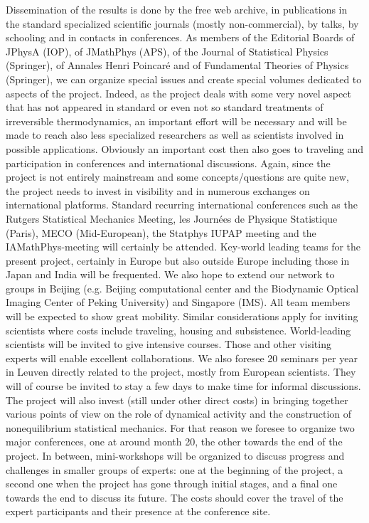 Dissemination of the results is done by the free web archive, in publications in the standard specialized scientific journals (mostly non-commercial), by talks, by schooling and in contacts in conferences. As members of the Editorial Boards of JPhysA (IOP), of JMathPhys (APS), of the Journal of Statistical Physics (Springer), of Annales Henri Poincar\'e and of Fundamental Theories of Physics (Springer), we can organize special issues and create special volumes dedicated to aspects of the project. Indeed, as the project deals with some very novel aspect that has not appeared in standard or even not so standard treatments of irreversible thermodynamics, an important effort will be necessary and will be made to reach also less specialized researchers as well as scientists involved in possible applications.
Obviously an important cost then also goes to traveling and participation in conferences and international discussions. Again, since the project is not entirely mainstream and some concepts/questions are quite new, the project needs to invest in visibility and in numerous exchanges on international platforms. Standard recurring international conferences such as the Rutgers Statistical Mechanics Meeting, les Journées de Physique Statistique (Paris), MECO (Mid-European), the Statphys IUPAP meeting and the IAMathPhys-meeting will certainly be attended.  Key-world leading teams for the present project, certainly in Europe but also outside Europe including those in Japan and India will be frequented. We also hope to extend our network to groups in Beijing (e.g. Beijing computational center and the Biodynamic Optical Imaging Center of Peking University) and Singapore (IMS).  All team members will be expected to show great mobility.  Similar considerations apply for inviting scientists where costs include traveling, housing and subsistence. World-leading scientists will be invited to give intensive courses.  Those and other visiting experts will enable excellent collaborations.  We also foresee 20 seminars per year in Leuven directly related to the project, mostly from European scientists. They will of course be invited to stay a few days to make time for informal discussions. The project will also invest (still under other direct costs) in bringing together various points of view on the role of dynamical activity and the construction of nonequilibrium statistical mechanics. For that reason we foresee to organize two major conferences, one at around month 20, the other towards the end of the project.  In between, mini-workshops will be organized to discuss progress and challenges in smaller groups of experts: one at the beginning of the project, a second one when the project has gone through initial stages, and a final one towards the end to discuss its future. The costs should cover the travel of the expert participants and their presence at the conference site.


